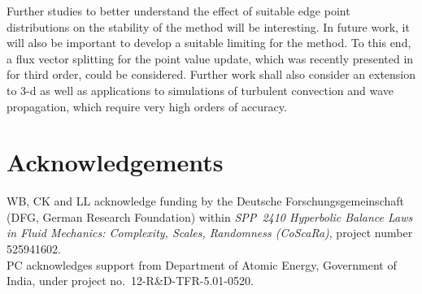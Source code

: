 \documentclass[12pt,a4paper]{article}
\begin{document}
Further studies to better understand the effect of suitable edge point distributions on the stability of the method will be interesting.
In future work, it will also be important to develop a suitable limiting for the method. To this end, a flux vector splitting for the point value update, which was recently presented in \cite{DBK2024pre} for third order, could be considered.
Further work shall also consider an extension to 3-d as well as applications to simulations of turbulent convection and wave propagation, which require very high orders of accuracy.



\section*{Acknowledgements}
\noindent WB, CK and LL acknowledge funding by the Deutsche Forschungsgemeinschaft (DFG, German Research Foundation) within \emph{SPP~2410 Hyperbolic Balance Laws in Fluid Mechanics: Complexity, Scales, Randomness (CoScaRa)}, project number 525941602.\\
PC acknowledges support from Department of Atomic Energy, Government of India, under project no.~12-R\&D-TFR-5.01-0520.
\end{document}
